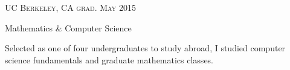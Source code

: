 
{\raggedright
  \textsc{\small{UC Berkeley, CA
    \hfill
    {\raggedleft
      grad. May 2015
    }
  }}

  {\raggedright\large {
    Mathematics \& Computer Science
  } \\}

  \normalsize{
    Selected as one of four undergraduates to study abroad, I studied computer science fundamentals and graduate mathematics classes.
  }

  \vspace{8pt}
}
